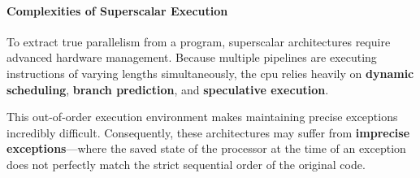 \paragraph{Complexities of Superscalar Execution}
To extract true parallelism from a program, superscalar architectures require advanced hardware management. Because multiple pipelines are executing instructions of varying lengths simultaneously, the \gls{cpu} relies heavily on \textbf{dynamic scheduling}, \textbf{branch prediction}, and \textbf{speculative execution}.

This out-of-order execution environment makes maintaining precise exceptions incredibly difficult. Consequently, these architectures may suffer from \textbf{imprecise exceptions}—where the saved state of the processor at the time of an exception does not perfectly match the strict sequential order of the original code.